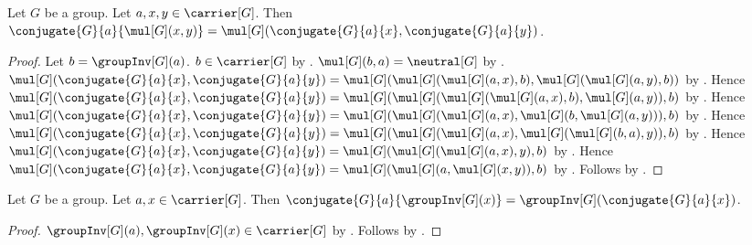 \begin{lemma}\label{spike17_conjugate_product}
    Let $G$ be a group.
    Let $a,x,y\in\carrier[G]$.
    Then
        $\conjugate{G}{a}{\mul[G](x,y)}
            =\mul[G](\conjugate{G}{a}{x},\conjugate{G}{a}{y})$.
\end{lemma}
\begin{proof}
    Let $b=\groupInv[G](a)$.
    $b\in\carrier[G]$ by
        .
    $\mul[G](b,a)=\neutral[G]$ by
        .
    $\mul[G](\conjugate{G}{a}{x},\conjugate{G}{a}{y})
        =\mul[G](
            \mul[G](\mul[G](a,x),b),
            \mul[G](\mul[G](a,y),b))$
        by .
    Hence
        $\mul[G](\conjugate{G}{a}{x},\conjugate{G}{a}{y})
        =\mul[G](
            \mul[G](\mul[G](\mul[G](a,x),b),\mul[G](a,y)),b)$
        by
        .
    Hence
        $\mul[G](\conjugate{G}{a}{x},\conjugate{G}{a}{y})
        =\mul[G](
            \mul[G](\mul[G](a,x),\mul[G](b,\mul[G](a,y))),b)$
        by
        .
    Hence
        $\mul[G](\conjugate{G}{a}{x},\conjugate{G}{a}{y})
        =\mul[G](
            \mul[G](\mul[G](a,x),\mul[G](\mul[G](b,a),y)),b)$
        by
        .
    Hence
        $\mul[G](\conjugate{G}{a}{x},\conjugate{G}{a}{y})
        =\mul[G](\mul[G](\mul[G](a,x),y),b)$
        by
        .
    Hence
        $\mul[G](\conjugate{G}{a}{x},\conjugate{G}{a}{y})
        =\mul[G](\mul[G](a,\mul[G](x,y)),b)$
        by
        .
    Follows by .
\end{proof}

\begin{lemma}\label{spike17_conjugate_inverse}
    Let $G$ be a group.
    Let $a,x\in\carrier[G]$.
    Then
        $\conjugate{G}{a}{\groupInv[G](x)}
            =\groupInv[G](\conjugate{G}{a}{x})$.
\end{lemma}
\begin{proof}
    $\groupInv[G](a),\groupInv[G](x)\in\carrier[G]$ by
        .
    Follows by
        .
\end{proof}

